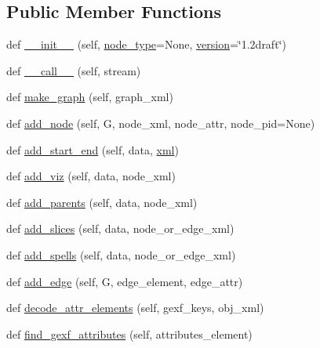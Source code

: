 \subsection*{Public Member Functions}
\begin{DoxyCompactItemize}
\item 
def \hyperlink{classnetworkx_1_1readwrite_1_1gexf_1_1GEXFReader_ad35842c57fecd6a6ea233500e6f1746d}{\+\_\+\+\_\+init\+\_\+\+\_\+} (self, \hyperlink{classnetworkx_1_1readwrite_1_1gexf_1_1GEXFReader_ab022efcb044daa1f42b2615cf23d138d}{node\+\_\+type}=None, \hyperlink{classnetworkx_1_1readwrite_1_1gexf_1_1GEXF_a3226aabb6dd2080faef052bca59a7a4d}{version}=\char`\"{}1.\+2draft\char`\"{})
\item 
def \hyperlink{classnetworkx_1_1readwrite_1_1gexf_1_1GEXFReader_ad6571092e71a7bc8e63aee400dd49aea}{\+\_\+\+\_\+call\+\_\+\+\_\+} (self, stream)
\item 
def \hyperlink{classnetworkx_1_1readwrite_1_1gexf_1_1GEXFReader_a31dce08291f09a87dc900455a32fd8f2}{make\+\_\+graph} (self, graph\+\_\+xml)
\item 
def \hyperlink{classnetworkx_1_1readwrite_1_1gexf_1_1GEXFReader_a0545a2351a867393be0d97335b9d36e5}{add\+\_\+node} (self, G, node\+\_\+xml, node\+\_\+attr, node\+\_\+pid=None)
\item 
def \hyperlink{classnetworkx_1_1readwrite_1_1gexf_1_1GEXFReader_a459e0b22788b6a31679647b2da00f497}{add\+\_\+start\+\_\+end} (self, data, \hyperlink{classnetworkx_1_1readwrite_1_1gexf_1_1GEXFReader_af0364bdce16a7a6b7b7a99ee8fc10c1d}{xml})
\item 
def \hyperlink{classnetworkx_1_1readwrite_1_1gexf_1_1GEXFReader_a33e5496e687ec9c13659f2f32da5be45}{add\+\_\+viz} (self, data, node\+\_\+xml)
\item 
def \hyperlink{classnetworkx_1_1readwrite_1_1gexf_1_1GEXFReader_adb62390b9dd350c3cb3c5deca922a87f}{add\+\_\+parents} (self, data, node\+\_\+xml)
\item 
def \hyperlink{classnetworkx_1_1readwrite_1_1gexf_1_1GEXFReader_a058f0bdb45b6d291f12d2aa08b6d3733}{add\+\_\+slices} (self, data, node\+\_\+or\+\_\+edge\+\_\+xml)
\item 
def \hyperlink{classnetworkx_1_1readwrite_1_1gexf_1_1GEXFReader_a7fe62cd89934c2d54b85dbcf5570f26a}{add\+\_\+spells} (self, data, node\+\_\+or\+\_\+edge\+\_\+xml)
\item 
def \hyperlink{classnetworkx_1_1readwrite_1_1gexf_1_1GEXFReader_a37c0172b3542a3e5df635ae02f6d73e0}{add\+\_\+edge} (self, G, edge\+\_\+element, edge\+\_\+attr)
\item 
def \hyperlink{classnetworkx_1_1readwrite_1_1gexf_1_1GEXFReader_a5abb072e006c2dac3b59a15be642bf1a}{decode\+\_\+attr\+\_\+elements} (self, gexf\+\_\+keys, obj\+\_\+xml)
\item 
def \hyperlink{classnetworkx_1_1readwrite_1_1gexf_1_1GEXFReader_a53cc096921cd5c7b90332f6e2d2e549d}{find\+\_\+gexf\+\_\+attributes} (self, attributes\+\_\+element)
\end{DoxyCompactItemize}
